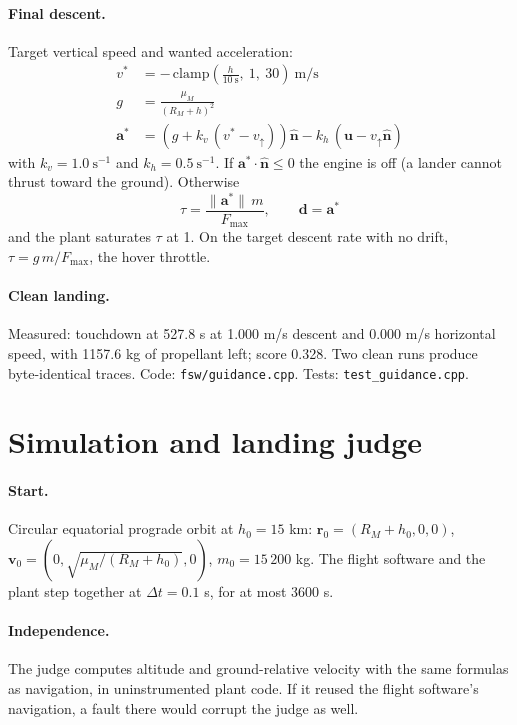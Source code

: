 \documentclass[11pt]{article}
\begin{document}
\paragraph{Final descent.} Target vertical speed and wanted acceleration:
\begin{align}
v^{*} &= -\,\mathrm{clamp}\!\left(\frac{h}{10\ \mathrm{s}},\ 1,\ 30\right)\ \text{m/s}\\
g &= \frac{\mu_M}{(R_M + h)^2}\\
\mathbf{a}^{*} &= \left(g + k_v\,(v^{*} - v_{\uparrow})\right)\hat{\mathbf{n}}
 - k_h\,(\mathbf{u} - v_{\uparrow}\hat{\mathbf{n}})
\end{align}
with $k_v = 1.0\ \mathrm{s}^{-1}$ and $k_h = 0.5\ \mathrm{s}^{-1}$. If
$\mathbf{a}^{*}\cdot\hat{\mathbf{n}} \le 0$ the engine is off (a lander cannot thrust toward
the ground). Otherwise
\begin{equation}
\tau = \frac{\lVert\mathbf{a}^{*}\rVert\, m}{F_{\max}}, \qquad \mathbf{d} = \mathbf{a}^{*}
\end{equation}
and the plant saturates $\tau$ at 1. On the target descent rate with no drift,
$\tau = g\,m/F_{\max}$, the hover throttle.

\paragraph{Clean landing.} Measured: touchdown at 527.8 s at 1.000 m/s descent and
0.000 m/s horizontal speed, with 1157.6 kg of propellant left; score 0.328. Two clean runs
produce byte-identical traces.
Code: \texttt{fsw/guidance.cpp}. Tests: \texttt{test\_guidance.cpp}.

\section{Simulation and landing judge}
\paragraph{Start.} Circular equatorial prograde orbit at $h_0 = 15$ km:
$\mathbf{r}_0 = (R_M + h_0, 0, 0)$, $\mathbf{v}_0 = (0, \sqrt{\mu_M / (R_M + h_0)}, 0)$,
$m_0 = 15\,200$ kg. The flight software and the plant step together at $\Delta t = 0.1$ s,
for at most 3600 s.

\paragraph{Independence.} The judge computes altitude and ground-relative velocity with
the same formulas as navigation, in uninstrumented plant code. If it reused the flight
software's navigation, a fault there would corrupt the judge as well.
\end{document}

